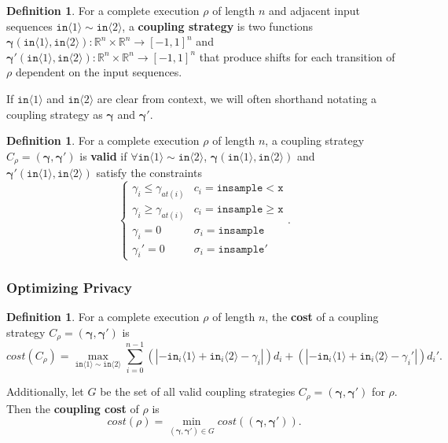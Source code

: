 \documentclass[12pt]{article}
\newcommand{\RR}{\mathbb{R}}
\newcommand{\gguard}[1][x]{\texttt{insample}\geq #1}
\newcommand{\lguard}[1][x]{\texttt{insample} < #1}
\newcommand{\brangle}[1]{\langle #1 \rangle}
\theoremstyle{definition}
\newtheorem{defn}[thm]{Definition}
\begin{document}
\begin{defn}
    For a complete execution $\rho$ of length $n$ and adjacent input sequences $\texttt{in}\brangle{1}\sim \texttt{in}\brangle{2}$, a \textbf{coupling strategy} is two functions $\bm{\gamma}(\texttt{in}\brangle{1}, \texttt{in}\brangle{2}):\RR^n\times \RR^n\to [-1, 1]^n$ and $\bm{\gamma}'(\texttt{in}\brangle{1}, \texttt{in}\brangle{2}):\RR^n\times \RR^n\to [-1, 1]^n$ that produce shifts for each transition of $\rho$ dependent on the input sequences. 

    If $\texttt{in}\brangle{1}$ and $\texttt{in}\brangle{2}$ are clear from context, we will often shorthand notating a coupling strategy as $\bm{\gamma}$ and $\bm{\gamma}'$. 
\end{defn}

\begin{defn}
    For a complete execution $\rho$ of length $n$, a coupling strategy $C_\rho = (\bm{\gamma}, \bm{\gamma}')$ is \textbf{valid} if $\forall \texttt{in}\brangle{1}\sim\texttt{in}\brangle{2}$, $\bm{\gamma}(\texttt{in}\brangle{1}, \texttt{in}\brangle{2})$ and $\bm{\gamma}'(\texttt{in}\brangle{1}, \texttt{in}\brangle{2})$ satisfy the constraints \[
        \begin{cases}
          \gamma_i\leq\gamma_{at(i)} & c_i = \lguard[\texttt{x}]\\
          \gamma_i\geq\gamma_{at(i)} & c_i = \gguard[\texttt{x}]\\
          \gamma_i=0 & \sigma_i = \texttt{insample}\\
          \gamma_i'=0 & \sigma_i = \texttt{insample}'
        \end{cases}.
      \]
\end{defn}

\subsubsection{Optimizing Privacy}

\begin{defn}
    For a complete execution $\rho$ of length $n$, the \textbf{cost} of a coupling strategy $C_\rho=(\bm{\gamma}, \bm{\gamma}')$ is \[cost(C_\rho) = \max_{\texttt{in}\brangle{1}\sim\texttt{in}\brangle{2}}\sum_{i=0}^{n-1}(|-\texttt{in}_i\brangle{1}+\texttt{in}_i\brangle{2}-\gamma_i|)d_i+(|-\texttt{in}_i\brangle{1}+\texttt{in}_i\brangle{2}-\gamma_i'|)d_i'.\]

    Additionally, let $G$ be the set of all valid coupling strategies $C_\rho=(\bm{\gamma}, \bm{\gamma}')$ for $\rho$. Then the \textbf{coupling cost} of $\rho$ is 
    \[cost(\rho) = \min_{(\bm{\gamma}, \bm{\gamma}')\in G}cost((\bm{\gamma}, \bm{\gamma}')).\]
\end{defn}
\end{document}
